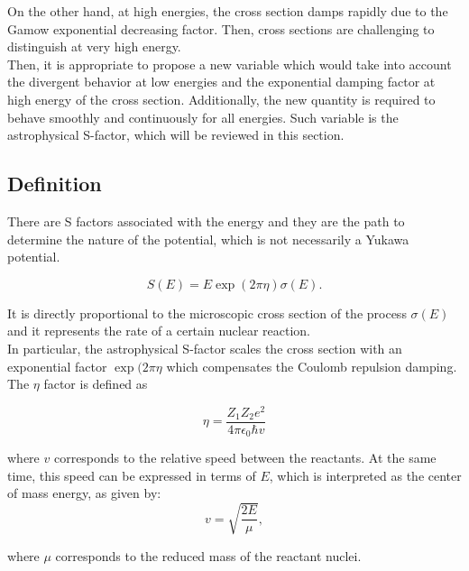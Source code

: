 \documentclass[openany]{book}
\begin{document}
On the other hand, at high energies, the cross section damps rapidly due to the Gamow exponential decreasing factor. Then, cross sections are challenging to distinguish at very high energy. \\ 

Then, it is appropriate to propose a new variable which would take into account the divergent behavior at low energies and the exponential damping factor at high energy of the cross section. Additionally, the new quantity is required to behave smoothly and continuously for all energies. Such variable is the astrophysical S-factor, which will be reviewed in this section. 

\subsection{Definition} \label{sub:sfactorMotivationDefinition}

There are S factors associated with the energy and they are the path to determine the nature of the potential, which is not necessarily a Yukawa potential.

\begin{equation} \label{eq:sfactor_definition}
	S(E) = E \exp({2\pi\eta}) \sigma({E}).
\end{equation} %

It is directly proportional to the microscopic cross section of the process $\sigma(E)$ and it represents the rate of a certain nuclear reaction.  \\

In particular, the astrophysical S-factor scales the cross section with an exponential factor $\exp({2\pi\eta}$ which compensates the Coulomb repulsion damping. The $\eta$ factor is defined as 

\begin{equation} \label{eq:sfactor_sommerfeld}
	\eta = \frac{Z_1Z_2e^2}{4\pi\epsilon_0\hbar v}
\end{equation}

where $v$ corresponds to the relative speed between the reactants. At the same time, this speed can be expressed in terms of $E$, which is interpreted as the center of mass energy, as given by: \\

\begin{equation}\label{eq:sfactor_speed}
	v = \sqrt{\frac{2E}{\mu}},
\end{equation} 

where $\mu$ corresponds to the reduced mass of the reactant nuclei. \\
\end{document}
